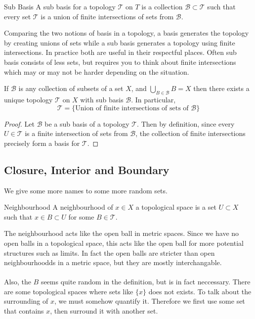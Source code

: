 \begin{defn}{Sub Basis}{} A sub basis for a topology $\mathcal{T}$ on $T$ is a collection $\mathcal{B}\subset\mathcal{T}$ such that every set $\mathcal{T}$ is a union of finite intersections of sets from $\mathcal{B}$. 
\end{defn}

Comparing the two notions of basis in a topology, a basis generates the topology by creating unions of sets while a sub basis generates a topology using finite intersections. In practice both are useful in their respectful places. Often sub basis consists of less sets, but requires you to think about finite intersections which may or may not be harder depending on the situation. 

\begin{prp}{}{} If $\mathcal{B}$ is any collection of subsets of a set $X$, and $\bigcup_{B\in\mathcal{B}}B=X$ then there exists a unique topology $\mathcal{T}$ on $X$ with sub basis $\mathcal{B}$. In particular, $$\mathcal{T}=\{\text{Union of finite intersections of sets of }\mathcal{B}\}$$ \tcbline
\begin{proof}
Let $\mathcal{B}$ be a sub basis of a topology $\mathcal{T}$. Then by definition, since every $U\in\mathcal{T}$ is a finite intersection of sets from $\mathcal{B}$, the collection of finite intersections precisely form a basis for $\mathcal{T}$. 
\end{proof}
\end{prp}

\subsection{Closure, Interior and Boundary}
We give some more names to some more random sets. 
\begin{defn}{Neighbourhood}{} A neighbourhood of $x\in X$ a topological space is a set $U\subset X$ such that $x\in B\subset U$ for some $B\in\mathcal{T}$. 
\end{defn}

The neighbourhood acts like the open ball in metric spaces. Since we have no open balls in a topological space, this acts like the open ball for more potential structures such as limits. In fact the open balls are stricter than open neighbourhoodds in a metric space, but they are mostly interchangable. \\~\\
Also, the $B$ seems quite random in the definition, but is in fact neccessary. There are some topological spaces where sets like $\{x\}$ does not exists. To talk about the surrounding of $x$, we must somehow quantify it. Therefore we first use some set that contains $x$, then surround it with another set. \\~\\

